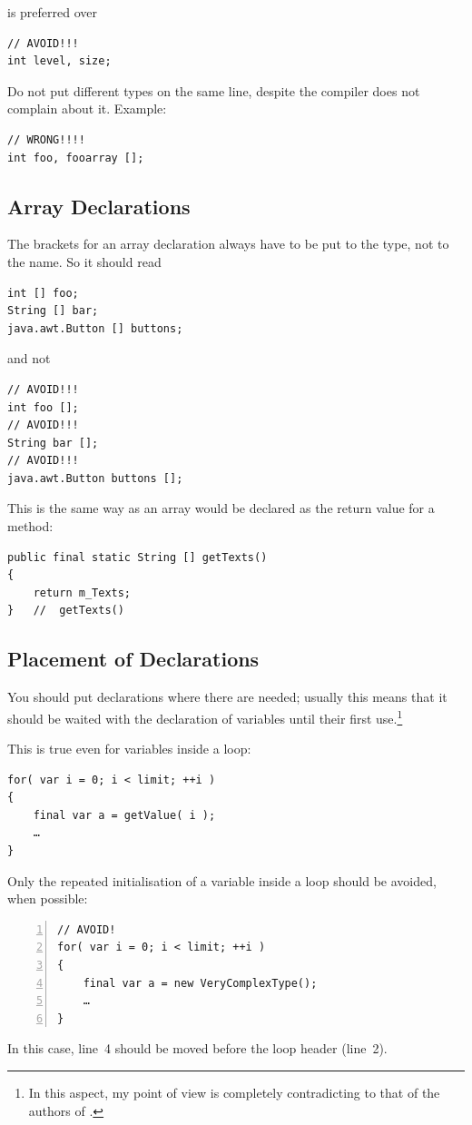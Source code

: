 \documentclass[12pt,a4paper,titlepage, parskip=half, headsepline, footsepline, cleardoubleplain]{scrbook}
\begin{document}
is preferred over

\begin{lstlisting}
// AVOID!!!
int level, size;
\end{lstlisting}

Do not put different types on the same line, despite the compiler does not complain about it. Example:
\begin{lstlisting}
// WRONG!!!!
int foo, fooarray [];
\end{lstlisting}

\subsection{Array Declarations}
The brackets for an array declaration always have to be put to the type, not to the name. So it should read
\begin{lstlisting}
int [] foo;
String [] bar;
java.awt.Button [] buttons;
\end{lstlisting}
and not
\begin{lstlisting}
// AVOID!!!
int foo [];
// AVOID!!!
String bar [];
// AVOID!!!
java.awt.Button buttons [];
\end{lstlisting}
This is the same way as an array would be declared as the return value for a method:
\begin{lstlisting}
public final static String [] getTexts()
{
    return m_Texts;
}	//	getTexts()
\end{lstlisting}

\subsection{Placement of Declarations}
You should put declarations where there are needed; usually this means that it should be waited with the declaration of variables until their first use.\footnote{In this aspect, my point of view is completely contradicting to that of the authors of \autocite{SUN_CODE_CONVENTIONS}.}

This is true even for variables inside a loop:
\begin{lstlisting}
for( var i = 0; i < limit; ++i )
{
    final var a = getValue( i );
    …
}
\end{lstlisting}

Only the repeated initialisation of a variable inside a loop should be avoided, when possible:
\begin{lstlisting}[numbers=left]
// AVOID!
for( var i = 0; i < limit; ++i )
{
    final var a = new VeryComplexType();
    …
}
\end{lstlisting}
In this case, line~4 should be moved before the loop header (line~2).
\end{document}
